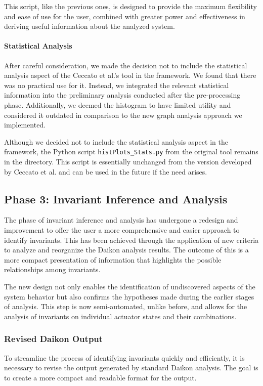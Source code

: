 This script, like the previous ones, is designed to provide the maximum flexibility and ease of use for the user, combined with greater power and effectiveness in deriving useful information about the analyzed system.

\paragraph{Statistical Analysis} After careful consideration, we made the decision not to include the statistical analysis aspect of the Ceccato et al.'s tool in the framework. We found that there was no practical use for it. Instead, we integrated the relevant statistical information into the preliminary analysis conducted after the pre-processing phase. Additionally, we deemed the histogram to have limited utility and considered it outdated in comparison to the new graph analysis approach we implemented. 

Although we decided not to include the statistical analysis aspect in the framework, the Python script \texttt{histPlots\_Stats.py} from the original tool remains in the directory. This script is essentially unchanged from the version developed by Ceccato et al. and can be used in the future if the need arises. 

\subsection{Phase 3: Invariant Inference and Analysis}
\label{subsec:4_improve_invariants}
The phase of invariant inference and analysis has undergone a redesign and improvement to offer the user a more comprehensive and easier approach to identify invariants. This has been achieved through the application of new criteria to analyze and reorganize the Daikon analysis results. The outcome of this is a more compact presentation of information that highlights the possible relationships among invariants.

The new design not only enables the identification of undiscovered aspects of the system behavior but also confirms the hypotheses made during the earlier stages of analysis. This step is now semi-automated, unlike before, and allows for the analysis of invariants on individual actuator states and their combinations.

\subsubsection{Revised Daikon Output}
\label{subsub:4_new_daikon_output}
To streamline the process of identifying invariants quickly and efficiently, it is necessary to revise the output generated by standard Daikon analysis. The goal is to create a more compact and readable format for the output.


